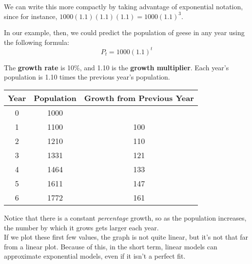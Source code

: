 We can write this more compactly by taking advantage of exponential notation, since for instance, $1000(1.1)(1.1)(1.1) = 1000(1.1)^3$.

In our example, then, we could predict the population of geese in any year using the following formula:
\[P_t = 1000(1.1)^t\]

The \textbf{growth rate} is 10\%, and 1.10 is the \textbf{growth multiplier}.  Each year's population is 1.10 times the previous year's population.

\begin{center}
\begin{tabular}{c | c | c}
\textbf{Year} & \textbf{Population} & \textbf{Growth from Previous Year}\\
\hline
0 & 1000 &\\
1 & 1100 & 100\\
2 & 1210 & 110\\
3 & 1331 & 121\\
4 & 1464 & 133\\
5 & 1611 & 147\\
6 & 1772 & 161
\end{tabular}
\end{center}
Notice that there is a constant \textit{percentage} growth, so as the population increases, the number by which it grows gets larger each year.\\

If we plot these first few values, the graph is not quite linear, but it's not that far from a linear plot.  Because of this, in the short term, linear models can approximate exponential models, even if it isn't a perfect fit.
\begin{center}
\end{center}

